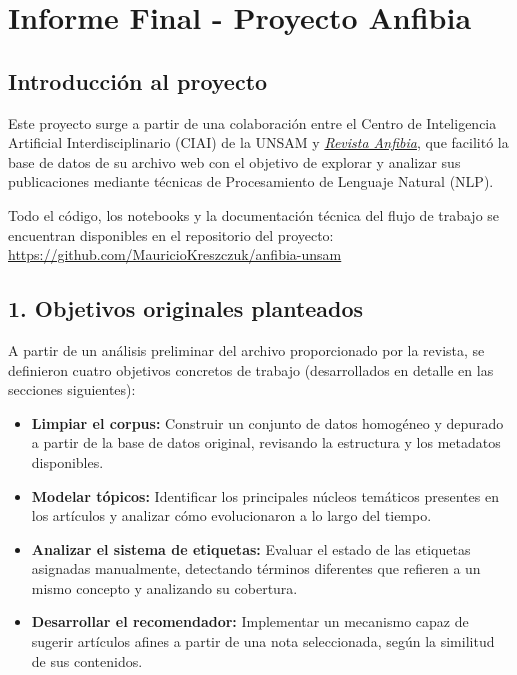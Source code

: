\documentclass[
]{article}
\author{}
\date{}
\begin{document}
\section*{Informe Final - Proyecto Anfibia}

\subsection{Introducción al proyecto}\label{introducciuxf3n-al-proyecto}

Este proyecto surge a partir de una colaboración entre el Centro de
Inteligencia Artificial Interdisciplinario (CIAI) de la UNSAM y
\href{https://www.revistaanfibia.com/}{\emph{Revista Anfibia}}, que
facilitó la base de datos de su archivo web con el objetivo de explorar
y analizar sus publicaciones mediante técnicas de Procesamiento de
Lenguaje Natural (NLP).

Todo el código, los notebooks y la documentación técnica del flujo de
trabajo se encuentran disponibles en el repositorio del proyecto:
\url{https://github.com/MauricioKreszczuk/anfibia-unsam}

\subsection{1. Objetivos originales
planteados}\label{objetivos-originales-planteados}

A partir de un análisis preliminar del archivo proporcionado por la
revista, se definieron cuatro objetivos concretos de trabajo
(desarrollados en detalle en las secciones siguientes):

\begin{itemize}
\item
  \textbf{Limpiar el corpus:} Construir un conjunto de datos homogéneo y
  depurado a partir de la base de datos original, revisando la
  estructura y los metadatos disponibles.
\item
  \textbf{Modelar tópicos:} Identificar los principales núcleos
  temáticos presentes en los artículos y analizar cómo evolucionaron a
  lo largo del tiempo.
\item
  \textbf{Analizar el sistema de etiquetas:} Evaluar el estado de las
  etiquetas asignadas manualmente, detectando términos diferentes que
  refieren a un mismo concepto y analizando su cobertura.
\item
  \textbf{Desarrollar el recomendador:} Implementar un mecanismo capaz
  de sugerir artículos afines a partir de una nota seleccionada, según
  la similitud de sus contenidos.
\end{itemize}
\end{document}
